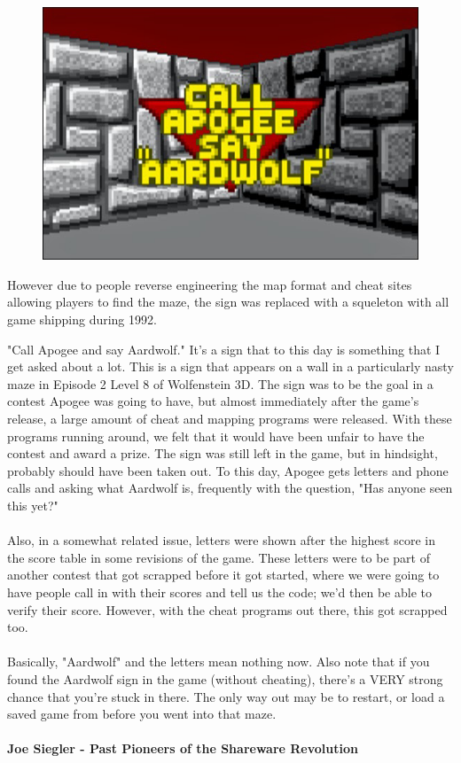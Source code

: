 \begin{figure}[H]
  \centering
 \includegraphics[width=\textwidth]{imgs/call_apogee.png}
\end{figure}
\par
However due to people reverse engineering the map format and cheat sites allowing players to find the maze, the sign was replaced with a squeleton with all game shipping during 1992.
\par
\begin{fancyquotes}
"Call Apogee and say Aardwolf."  It's a sign that to this day is something
that I get asked about a lot.  This is a sign that appears on a wall in a
particularly nasty maze in Episode 2 Level 8 of Wolfenstein 3D.  The sign
was to be the goal in a contest Apogee was going to have, but almost
immediately after the game's release, a large amount of cheat and mapping
programs were released.  With these programs running around, we felt that
it would have been unfair to have the contest and award a prize.  The sign
was still left in the game, but in hindsight, probably should have been
taken out.  To this day, Apogee gets letters and phone calls and asking
what Aardwolf is, frequently with the question, "Has anyone seen this yet?"\\
\\
Also, in a somewhat related issue, letters were shown after the highest score
in the score table in some revisions of the game.  These letters were to be
part of another contest that got scrapped before it got started, where we were
going to have people call in with their scores and tell us the code; we'd then
be able to verify their score.  However, with the cheat programs out there,
this got scrapped too.\\
\\
Basically, "Aardwolf" and the letters mean nothing now.  Also note that if
you found the Aardwolf sign in the game (without cheating), there's a VERY
strong chance that you're stuck in there.  The only way out may be to restart,
or load a saved game from before you went into that maze.\\
\\
\textbf{Joe Siegler - Past Pioneers of the Shareware Revolution}
\end{fancyquotes}
